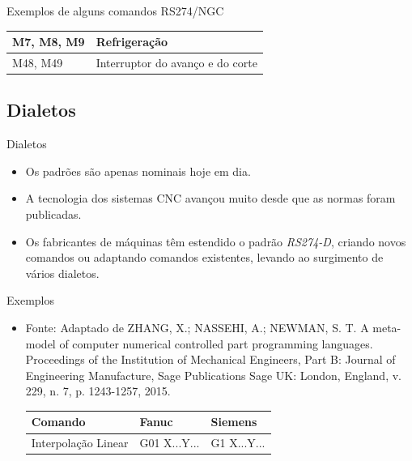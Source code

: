 \documentclass[aspectratio=169]{beamer}
\begin{document}
{\begin{frame}{Exemplos de alguns comandos RS274/NGC}
\begin{table}[H]
\begin{tabular}{p{7cm}|p{5cm}}
      \hline
      \scriptsize{M7, M8, M9}
      & \scriptsize{Refrigera\c c\~ao} \\
  
      \hline
      \scriptsize{M48, M49}
      & \scriptsize{Interruptor do avan\c co e do corte} \\

      \hline
  
    \end{tabular}
  \end{table}

\end{frame}


\subsection{Dialetos}

\begin{frame}{Dialetos}
  \begin{itemize}
  \item {
    Os padrões são apenas nominais hoje em dia.     
  }
  \item {   
    A tecnologia dos sistemas CNC avançou muito desde que as normas 
    foram publicadas.
  }
  \item {
    Os fabricantes de máquinas têm estendido o padrão \emph{RS274-D}, 
    criando novos comandos ou adaptando comandos existentes, levando 
    ao surgimento de vários dialetos. 
  }
  \end{itemize}
\end{frame}


\begin{frame}{Exemplos}
  \begin{itemize}
    \item {
      Fonte: Adaptado de ZHANG, X.; NASSEHI, A.; NEWMAN, S. T. A meta-model of computer numerical
      controlled part programming languages. Proceedings of the Institution of
      Mechanical Engineers, Part B: Journal of Engineering Manufacture, Sage
      Publications Sage UK: London, England, v. 229, n. 7, p. 1243-1257, 2015.
      \begin{table}[H]
        \centering    
        {\begin{tabular}{p{4.3cm}|p{2.6cm}|p{2.4cm}}
          \hline
          \bfseries{\footnotesize{Comando}} & 
          \bfseries{\footnotesize{Fanuc}} & 
          \bfseries{\footnotesize{Siemens}} \\
      
          \hline
          \footnotesize{Interpolação Linear} & 
          \footnotesize{G01 X...Y...} & 
          \footnotesize{G1 X...Y...} \\
      

\end{tabular}}
\end{table}}
\end{itemize}
\end{frame}}
\end{document}
